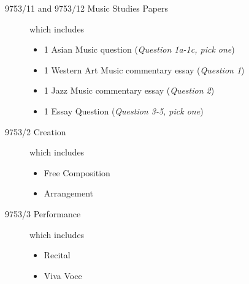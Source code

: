 \begin{titlepage}
    \begin{description}
        \item[9753/11 and 9753/12 Music Studies Papers] which includes
        \begin{itemize}
            \item 1 Asian Music question (\textit{Question 1a-1c, pick one})
            \item 1 Western Art Music commentary essay (\textit{Question 1})
            \item 1 Jazz Music commentary essay (\textit{Question 2})
            \item 1 Essay Question (\textit{Question 3-5, pick one})
    \end{itemize}
    \vspace{2mm}
        \item[9753/2 Creation] which includes
        \begin{itemize}
            \item Free Composition
            \item Arrangement
        \end{itemize}
    \vspace{2mm}
        \item[9753/3 Performance] which includes
        \begin{itemize}
            \item Recital
            \item Viva Voce
        \end{itemize}
    \end{description}
    
    \vspace*{\fill}
    \end{titlepage}
    
    